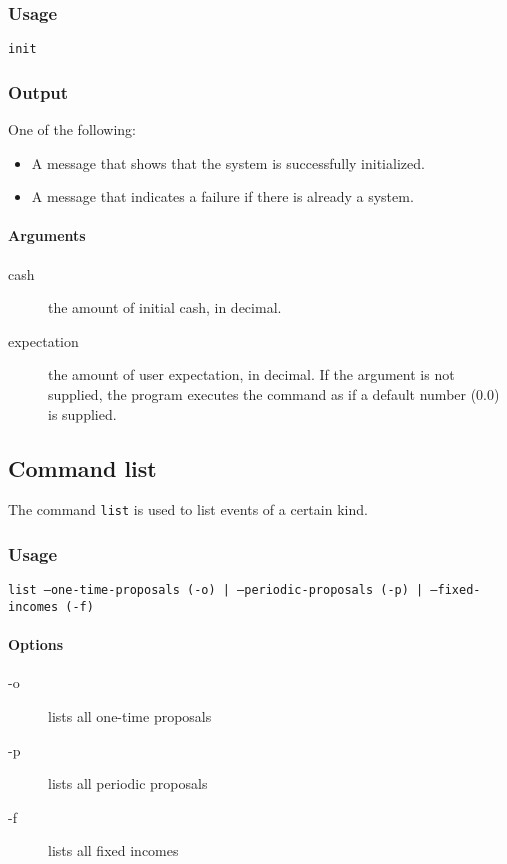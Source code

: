 \subsubsection{Usage}
\begin{center}
	\texttt{init}  
\end{center}

\subsubsection{Output}
One of the following:
\begin{itemize}
	\item A message that shows that the system is successfully initialized.
	\item A message that indicates a failure if there is already a system.
\end{itemize}

\paragraph{Arguments}
\begin{description}
	\item[cash] the amount of initial cash, in decimal.
	\item[expectation] the amount of user expectation, in decimal. If the argument is not supplied, the program executes the command as if a default number (0.0) is supplied.
\end{description}

\subsection{Command list}
The command \texttt{list} is used to list events of a certain kind.

\subsubsection{Usage}
\begin{center}
	\texttt{list  --one-time-proposals (-o) | --periodic-proposals (-p) | --fixed-incomes (-f)}
\end{center}

\paragraph{Options}
\begin{description}
	\item[-o] lists all one-time proposals
	\item[-p] lists all periodic proposals
	\item[-f] lists all fixed incomes
\end{description}

